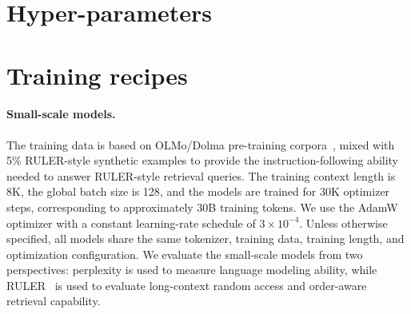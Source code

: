 \section{Hyper-parameters}\label{appdx:hyper-params}
\begin{table}[h!]
\centering
{}
\vspace{0.1cm}
\caption{Model hyperparameters used in the small-, medium-, and large-scale experiments. The vocab size is the original OLMo3 vocabulary plus one additional landmark-token embedding. Chunk/Top-$k$ = 64/32 corresponds to retrieving 2048 tokens.}
\end{table}

\section{Training recipes}\label{apdx:training_recipe}
\paragraph{Small-scale models.}
The training data is based on OLMo/Dolma pre-training corpora~\citep{allenai_dolma3_mix_6t}, mixed with 5\% RULER-style synthetic examples to provide the instruction-following ability needed to answer RULER-style retrieval queries. The training context length is 8K, the global batch size is 128, and the models are trained for 30K optimizer steps, corresponding to approximately 30B training tokens. We use the AdamW optimizer with a constant learning-rate schedule of \(3\times10^{-4}\). Unless otherwise specified, all models share the same tokenizer, training data, training length, and optimization configuration. We evaluate the small-scale models from two perspectives: perplexity is used to measure language modeling ability, while RULER~\citep{hsieh2024ruler} is used to evaluate long-context random access and order-aware retrieval capability.

